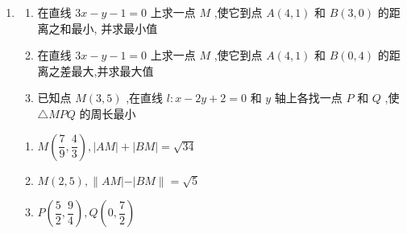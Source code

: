\begin{enumerate}
    
    \item \begin{enumerate}
        \item 在直线 ${3x} - y - 1 = 0$ 上求一点 $M$ ,使它到点 ${A}\left( {4,1}\right)$ 和 ${B}\left( {3,0}\right)$ 的距离之和最小, 并求最小值
        \item 在直线 ${3x} - y - 1 = 0$ 上求一点 $M$ ,使它到点 ${A}\left( {4,1}\right)$ 和 ${B}\left( {0,4}\right)$ 的距离之差最大,并求最大值
        \item 已知点 ${M}\left( {3,5}\right)$ ,在直线 $l : x - {2y} + 2 = 0$ 和 $y$ 轴上各找一点 ${P}$ 和 ${Q}$ ,使 $\bigtriangleup  {{MPQ}}$ 的周长最小
    \end{enumerate}
    \begin{jieda}
        \begin{enumerate}
            \item $M\left( {\dfrac{7}{9},\dfrac{4}{3}}\right) ,\left| {AM}\right|  + \left| {BM}\right|  = \sqrt{34}$
            
            \item $M\left( {2,5}\right) ,\parallel {AM}\left| -\right| {BM}\parallel  = \sqrt{5}$
            
            \item $P\left( {\dfrac{5}{2},\dfrac{9}{4}}\right) ,Q\left( {0,\dfrac{7}{2}}\right)$
        \end{enumerate}
    \end{jieda}
    

\end{enumerate}
